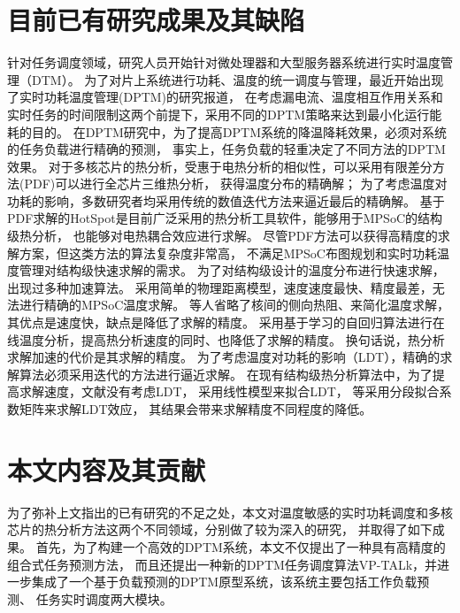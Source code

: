 \section{目前已有研究成果及其缺陷}
针对任务调度领域，研究人员开始针对微处理器和大型服务器系统进行实时温度管理（DTM）。 为了对片上系统进行功耗、温度的统一调度与管理，最近开始出现了实时功耗温度管理(DPTM)的研究报道， 在考虑漏电流、温度相互作用关系和实时任务的时间限制这两个前提下，采用不同的DPTM策略来达到最小化运行能耗的目的。
在DPTM研究中，为了提高DPTM系统的降温降耗效果，必须对系统的任务负载进行精确的预测， 事实上，任务负载的轻重决定了不同方法的DPTM效果。
对于多核芯片的热分析，受惠于电热分析的相似性，可以采用有限差分方法(PDF)可以进行全芯片三维热分析， 获得温度分布的精确解； 为了考虑温度对功耗的影响，多数研究者均采用传统的数值迭代方法来逼近最后的精确解。
基于PDF求解的HotSpot是目前广泛采用的热分析工具软件，能够用于MPSoC的结构级热分析， 也能够对电热耦合效应进行求解。 尽管PDF方法可以获得高精度的求解方案，但这类方法的算法复杂度非常高， 不满足MPSoC布图规划和实时功耗温度管理对结构级快速求解的需求。
为了对结构级设计的温度分布进行快速求解， 出现过多种加速算法。 采用简单的物理距离模型，速度速度最快、精度最差，无法进行精确的MPSoC温度求解。 等人省略了核间的侧向热阻、来简化温度求解， 其优点是速度快，缺点是降低了求解的精度。 采用基于学习的自回归算法进行在线温度分析，提高热分析速度的同时、也降低了求解的精度。 换句话说，热分析求解加速的代价是其求解的精度。
为了考虑温度对功耗的影响（LDT），精确的求解算法必须采用迭代的方法进行逼近求解。 在现有结构级热分析算法中，为了提高求解速度，文献没有考虑LDT， 采用线性模型来拟合LDT， 等采用分段拟合系数矩阵来求解LDT效应， 其结果会带来求解精度不同程度的降低。

\section{本文内容及其贡献}
为了弥补上文指出的已有研究的不足之处，本文对温度敏感的实时功耗调度和多核芯片的热分析方法这两个不同领域，分别做了较为深入的研究， 并取得了如下成果。
首先，为了构建一个高效的DPTM系统，本文不仅提出了一种具有高精度的组合式任务预测方法， 而且还提出一种新的DPTM任务调度算法VP-TALk，并进一步集成了一个基于负载预测的DPTM原型系统，该系统主要包括工作负载预测、 任务实时调度两大模块。

